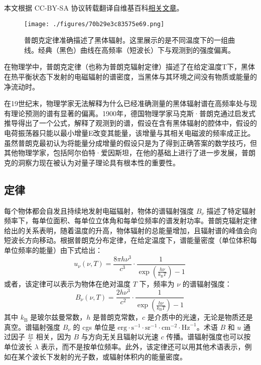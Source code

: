 
本文根据 CC-BY-SA 协议转载翻译自维基百科\href{https://en.wikipedia.org/wiki/Michael_Faraday}{相关文章}。

\begin{figure}[ht]
\centering
\texttt{[image: ./figures/70b29e3c83575e69.png]}
\caption{普朗克定律准确描述了黑体辐射。这里展示的是不同温度下的一组曲线。经典（黑色）曲线在高频率（短波长）下与观测到的强度偏离。} \label{fig_HTFS_1}
\end{figure}
在物理学中，普朗克定律（也称为普朗克辐射定律）描述了在给定温度T下，黑体在热平衡状态下发射的电磁辐射的谱密度，当黑体与其环境之间没有物质或能量的净流动时。

在19世纪末，物理学家无法解释为什么已经准确测量的黑体辐射谱在高频率处与现有理论预测的谱有显著的偏离。1900年，德国物理学家马克斯·普朗克通过启发式推导得出了一个公式，解释了观测到的谱，假设在含有黑体辐射的腔体中，假设的电荷振荡器只能以最小增量E改变其能量，该增量与其相关电磁波的频率成正比。虽然普朗克最初认为将能量分成增量的假设只是为了得到正确答案的数学技巧，但其他物理学家，包括阿尔伯特·爱因斯坦，在他的基础上进行了进一步发展，普朗克的洞察力现在被认为对量子理论具有根本性的重要性。
\subsection{定律}
每个物体都会自发且持续地发射电磁辐射，物体的谱辐射强度 \( B_\nu \) 描述了特定辐射频率下，每单位面积、每单位立体角和每单位频率的谱发射功率。普朗克辐射定律给出的关系表明，随着温度的升高，物体辐射的总能量增加，且辐射谱的峰值会向短波长方向移动。根据普朗克分布定律，在给定温度下，谱能量密度（单位体积每单位频率的能量）由下式给出：
\[
u_\nu(\nu, T) = \frac{8 \pi h \nu^3}{c^3} \cdot \frac{1}{\exp \left( \frac{h \nu}{k_{\mathrm{B}} T} \right) - 1}~
\]
或者，该定律可以表示为物体在绝对温度 \( T \) 下，频率为 \( \nu \) 的谱辐射强度：
\[
B_\nu(\nu, T) = \frac{2 h \nu^3}{c^2} \cdot \frac{1}{\exp \left( \frac{h \nu}{k_{\mathrm{B}} T} \right) - 1}~
\]
其中 \( k_{\mathrm{B}} \) 是玻尔兹曼常数，\( h \) 是普朗克常数，\( c \) 是介质中的光速，无论是物质还是真空。谱辐射强度 \( B_\nu \) 的 cgs 单位是 \( \text{erg} \cdot \text{s}^{-1} \cdot \text{sr}^{-1} \cdot \text{cm}^{-2} \cdot \text{Hz}^{-1} \)。术语 \( B \) 和 \( u \) 通过因子 \( \frac{4 \pi}{c} \) 相关，因为 \( B \) 与方向无关且辐射以光速 \( c \) 传播。谱辐射强度也可以按单位波长 \( \lambda \) 表示，而不是按单位频率。此外，该定律还可以用其他术语表示，例如在某个波长下发射的光子数，或辐射体积内的能量密度。

